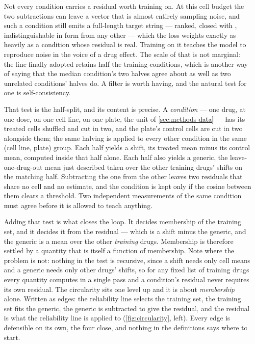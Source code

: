 Not every condition carries a residual worth training on. At this cell budget the
two subtractions can leave a vector that is almost entirely sampling noise, and
such a condition still emits a full-length target string --- ranked, closed with
\ENDCELL{}, indistinguishable in form from any other --- which the loss weights
exactly as heavily as a condition whose residual is real. Training on it teaches
the model to reproduce noise in the voice of a drug effect. The scale of that is
not marginal: the line finally adopted retains half the training conditions, which
is another way of saying that the median condition's two halves agree about as
well as two unrelated conditions' halves do. A filter is worth having, and the
natural test for one is self-consistency.

That test is the half-split, and its content is precise. A \emph{condition} ---
one drug, at one dose, on one cell line, on one plate, the unit of
\cref{sec:methods-data} --- has its treated cells shuffled and cut in two, and the
plate's control cells are cut in two alongside them; the same halving is applied
to every other condition in the same (cell line, plate) group. Each half yields a
shift, its treated mean minus its control mean, computed inside that half alone.
Each half also yields a generic, the leave-one-drug-out mean just described taken
over the other training drugs' shifts on the matching half. Subtracting the one
from the other leaves two residuals that share no cell and no estimate, and the
condition is kept only if the cosine between them clears a threshold. Two
independent measurements of the same condition must agree before it is allowed to
teach anything.

Adding that test is what closes the loop. It decides membership of the training
set, and it decides it from the residual --- which is a shift minus the generic,
and the generic is a mean over the other \emph{training} drugs. Membership is
therefore settled by a quantity that is itself a function of membership. Note
where the problem is not: nothing in the test is recursive, since a shift needs
only cell means and a generic needs only other drugs' shifts, so for any fixed
list of training drugs every quantity computes in a single pass and a condition's
residual never requires its own residual. The circularity sits one level up and it
is about \emph{membership} alone. Written as edges: the reliability line selects
the training set, the training set fits the generic, the generic is subtracted to
give the residual, and the residual is what the reliability line is applied to
(\cref{fig:circularity}, left). Every edge is defensible on its own, the four
close, and nothing in the definitions says where to start.

